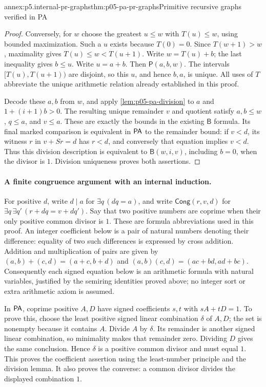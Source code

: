 \begin{annexitem}{annex:p5.internal-pr-graphs}{thm:p05-pa-pr-graphs}{Primitive recursive graphs verified in PA}
\begin{proof}
Conversely, for \(w\) choose the greatest \(u\leq w\) with
\(T(u)\leq w\), using bounded maximization.  Such a \(u\) exists
because \(T(0)=0\).  Since \(T(w+1)>w\), maximality gives
\(T(u)\leq w<T(u+1)\).  Write \(w=T(u)+b\); the last inequality
gives \(b\leq u\).  Write \(u=a+b\).  Then
\(\mathsf P(a,b,w)\).  The intervals
\([T(u),T(u+1))\) are disjoint, so this \(u\), and hence \(b,a\),
is unique.  All uses of \(T\) abbreviate the unique arithmetic relation
already established in this proof.

Decode these \(a,b\) from \(w\), and apply
\cref{lem:p05-pa-division} to \(a\) and \(1+(i+1)b>0\).
The resulting unique remainder \(v\) and quotient satisfy
\(a,b\leq w\), \(q\leq a\), and \(v\leq a\).
These are exactly the bounds in the existing \(\mathsf B\) formula.
Its final marked comparison is equivalent in \(\mathsf{PA}\) to the remainder
bound: if \(v<d\), its witness \(r\) in \(v+Sr=d\) has \(r<d\),
and conversely that equation implies \(v<d\).  Thus this division
description is equivalent to \(\mathsf B(w,i,v)\), including \(b=0\),
when the divisor is \(1\).  Division uniqueness proves both assertions.
\end{proof}

\paragraph{A finite congruence argument with an internal induction.}
For positive \(d\), write \(d\mid a\) for \(\exists q\,(dq=a)\),
and write \(\mathsf{Cong}(r,v,d)\) for
\(\exists q\,\exists q'\,(r+dq=v+dq')\).
Say that two positive numbers are coprime when their only positive common
divisor is \(1\).  These are formula abbreviations used in this proof.
An integer coefficient below is a pair of natural numbers denoting their
difference: equality of two such differences is expressed by cross addition.
Addition and multiplication of pairs are given by
\((a,b)+(c,d)=(a+c,b+d)\) and
\((a,b)(c,d)=(ac+bd,ad+bc)\).  Consequently each signed equation below
is an arithmetic formula with natural variables, justified by the semiring
identities proved above; no integer sort or extra arithmetic axiom is assumed.

In \(\mathsf{PA}\), coprime positive \(A,D\) have signed coefficients
\(s,t\) with \(sA+tD=1\).  To prove this, choose the least positive
signed linear combination \(\delta\) of \(A,D\); the set is nonempty
because it contains \(A\).  Divide \(A\) by \(\delta\).  Its remainder
is another signed linear combination, so minimality makes that remainder
zero.  Dividing \(D\) gives the same conclusion.  Hence \(\delta\)
is a positive common divisor and must equal \(1\).  This proves the
coefficient assertion using the least-number principle and the division
lemma.  It also proves the converse: a common divisor divides the displayed
combination \(1\).


\end{annexitem}
